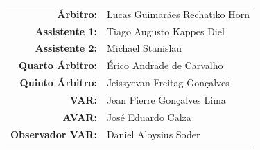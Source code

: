 \documentclass[11pt]{article}
\begin{document}
\vspace{0.5cm}
\begin{minipage}{0.65\textwidth}
\begin{center}
\begin{tabular}{rl}
\textbf{Árbitro:} & Lucas Guimarães Rechatiko Horn \\
\textbf{Assistente 1:} & Tiago Augusto Kappes Diel \\
\textbf{Assistente 2:} & Michael Stanislau \\
\textbf{Quarto Árbitro:} & Érico Andrade de Carvalho \\
\textbf{Quinto Árbitro:} & Jeissyevan Freitag Gonçalves \\
\textbf{VAR:} & Jean Pierre Gonçalves Lima \\
\textbf{AVAR:} & José Eduardo Calza \\
\textbf{Observador VAR:} & Daniel Aloysius Soder \\
\end{tabular}
\end{center}
\end{minipage}
\begin{minipage}{0.3\textwidth}
\end{minipage}
\newpage
\end{document}
